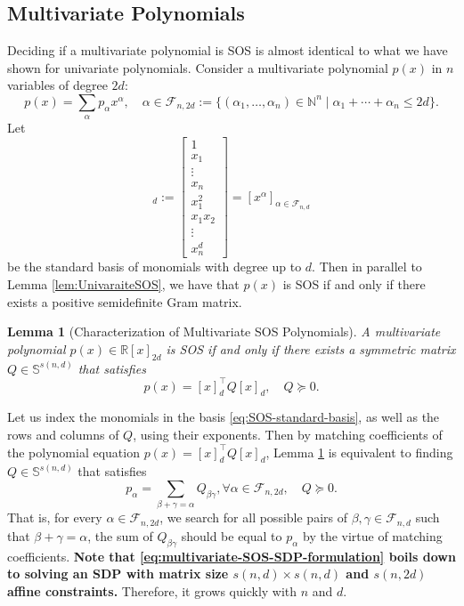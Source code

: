 \documentclass[
]{book}
\newtheorem{lemma}{Lemma}[chapter]
\theoremstyle{definition}
\theoremstyle{definition}
\theoremstyle{definition}
\theoremstyle{definition}
\theoremstyle{remark}
\begin{document}
\subsection{Multivariate Polynomials}\label{multivariate-polynomials}

Deciding if a multivariate polynomial is SOS is almost identical to what we have shown for univariate polynomials. Consider a multivariate polynomial \(p(x)\) in \(n\) variables of degree \(2d\):
\[
p(x) = \sum_{\alpha} p_{\alpha} x^{\alpha}, \quad \alpha \in \mathcal{F}_{n,2d} := \{ (\alpha_1,\dots,\alpha_n) \in \mathbb{N}^n \mid \alpha_1 + \cdots + \alpha_n \leq 2d \}.
\]
Let
\begin{equation}
[x]_d := \begin{bmatrix} 1 \\ x_1 \\ \vdots \\ x_n \\ x_1^2 \\ x_1 x_2 \\ \vdots \\ x_n^d \end{bmatrix} = [x^\alpha]_{\alpha \in \mathcal{F}_{n,d}}
\label{eq:SOS-standard-basis}
\end{equation}
be the standard basis of monomials with degree up to \(d\). Then in parallel to Lemma \ref{lem:UnivaraiteSOS}, we have that \(p(x)\) is SOS if and only if there exists a positive semidefinite Gram matrix.

\begin{lemma}[Characterization of Multivariate SOS Polynomials]
\protect\hypertarget{lem:MultivariateSOS}{}\label{lem:MultivariateSOS}A multivariate polynomial \(p(x) \in \mathbb{R}[x]_{2d}\) is SOS if and only if there exists a symmetric matrix \(Q \in \mathbb{S}^{s(n,d)}\) that satisfies
\[
p(x) = [x]_d^\top Q [x]_d, \quad Q \succeq 0.
\]
\end{lemma}

Let us index the monomials in the basis \eqref{eq:SOS-standard-basis}, as well as the rows and columns of \(Q\), using their exponents. Then by matching coefficients of the polynomial equation \(p(x) = [x]_d^\top Q [x]_d\), Lemma \ref{lem:MultivariateSOS} is equivalent to finding \(Q \in \mathbb{S}^{s(n,d)}\) that satisfies
\begin{equation}
p_\alpha = \sum_{\beta + \gamma = \alpha} Q_{\beta\gamma}, \forall \alpha \in \mathcal{F}_{n,2d}, \quad Q \succeq 0.
\label{eq:multivariate-SOS-SDP-formulation}
\end{equation}
That is, for every \(\alpha \in \mathcal{F}_{n,2d}\), we search for all possible pairs of \(\beta,\gamma \in \mathcal{F}_{n,d}\) such that \(\beta + \gamma = \alpha\), the sum of \(Q_{\beta \gamma}\) should be equal to \(p_{\alpha}\) by the virtue of matching coefficients. \textbf{Note that \eqref{eq:multivariate-SOS-SDP-formulation} boils down to solving an SDP with matrix size \(s(n,d) \times s(n,d)\) and \(s(n,2d)\) affine constraints.} Therefore, it grows quickly with \(n\) and \(d\).
\end{document}
